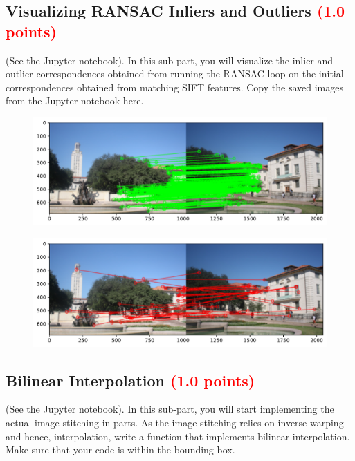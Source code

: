 \documentclass[answers]{exam}
\newcommand{\mypoints}[1]{\textcolor{red}{(#1 points)}}
\begin{document}
\subsection{Visualizing RANSAC Inliers and Outliers \mypoints{1.0}}
(See the Jupyter notebook). In this sub-part, you will visualize the inlier and outlier correspondences obtained from running the RANSAC loop on the initial correspondences obtained from matching SIFT features. Copy the saved images from the Jupyter notebook here.

\begin{solution}
    \begin{figure}[H]
        \centering
        \includegraphics[width=\linewidth]{Data/Solutions/question_3_8_inliers.pdf}
    \end{figure}
    \begin{figure}[H]
        \centering
        \includegraphics[width=\linewidth]{Data/Solutions/question_3_8_outliers.pdf}
    \end{figure}
\end{solution}

\subsection{Bilinear Interpolation \mypoints{1.0}}
(See the Jupyter notebook). In this sub-part, you will start implementing the actual image stitching in parts. As the image stitching relies on inverse warping and hence, interpolation, write a function that implements bilinear interpolation. Make sure that your code is within the bounding box.
\end{document}
